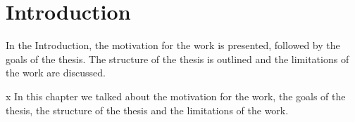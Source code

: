 \section{Introduction} \label{sec:intro}
In the Introduction, the motivation for the work is presented, followed by the goals of the thesis.
The structure of the thesis is outlined and the limitations of the work are discussed.









x
{\color{lightgray}
In this chapter we talked about the motivation for the work, the goals of the thesis,
the structure of the thesis and the limitations of the work.
}